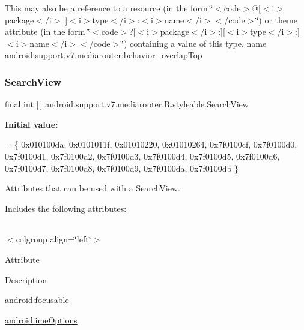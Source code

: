 This may also be a reference to a resource (in the form \char`\"{}$<$code$>$@\mbox{[}$<$i$>$package$<$/i$>$\+:\mbox{]}$<$i$>$type$<$/i$>$\+:$<$i$>$name$<$/i$>$$<$/code$>$\char`\"{}) or theme attribute (in the form \char`\"{}$<$code$>$?\mbox{[}$<$i$>$package$<$/i$>$\+:\mbox{]}\mbox{[}$<$i$>$type$<$/i$>$\+:\mbox{]}$<$i$>$name$<$/i$>$$<$/code$>$\char`\"{}) containing a value of this type.  name android.\+support.\+v7.\+mediarouter\+:behavior\+\_\+overlap\+Top \mbox{\label{classandroid_1_1support_1_1v7_1_1mediarouter_1_1R_1_1styleable_a5573e3195bf93122a37c69394418c7d7}} 
\subsubsection{\texorpdfstring{Search\+View}{SearchView}}
{\footnotesize\ttfamily final int \mbox{[}$\,$\mbox{]} android.\+support.\+v7.\+mediarouter.\+R.\+styleable.\+Search\+View\hspace{0.3cm}{\ttfamily [static]}}

{\bfseries Initial value\+:}
\begin{DoxyCode}
= \{
            0x010100da, 0x0101011f, 0x01010220, 0x01010264,
            0x7f0100cf, 0x7f0100d0, 0x7f0100d1, 0x7f0100d2,
            0x7f0100d3, 0x7f0100d4, 0x7f0100d5, 0x7f0100d6,
            0x7f0100d7, 0x7f0100d8, 0x7f0100d9, 0x7f0100da,
            0x7f0100db
        \}
\end{DoxyCode}
Attributes that can be used with a Search\+View. 

Includes the following attributes\+:

\tabulinesep=1mm
\begin{longtabu} spread 0pt [c]{*{0}{|X[-1]}|}
\hline
\end{longtabu}
$<$colgroup align=\char`\"{}left\char`\"{}$>$ 

Attribute

Description 

{\ttfamily \hyperlink{classandroid_1_1support_1_1v7_1_1mediarouter_1_1R_1_1styleable_a409578cfacc43a6019fc4ba0da3b4ac7}{android\+:focusable}}

{\ttfamily \hyperlink{classandroid_1_1support_1_1v7_1_1mediarouter_1_1R_1_1styleable_aac95101925665a6dff1249a18559dad5}{android\+:ime\+Options}}

